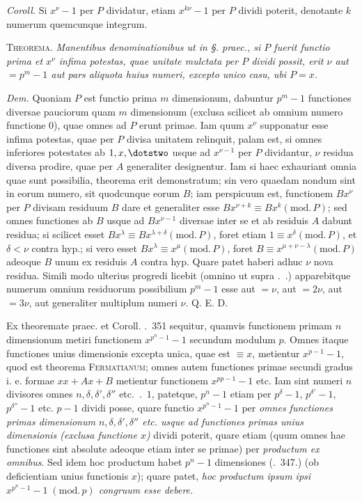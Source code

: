 \emph{Coroll.} Si $x^\nu-1$ per $P$ dividatur, etiam $x^{k\nu}-1$ per $P$ dividi poterit, denotante $k$ numerum quemcunque integrum.

\textsc{Theorema.} \emph{Manentibus denominationibus ut in §. praec., si $P$ fuerit functio prima et $x^\nu$ infima potestas, quae unitate mulctata per $P$ dividi possit, erit $\nu$ aut $=p^m-1$ aut pars aliquota huius numeri, excepto unico casu, ubi $P=x$.}

\emph{Dem.} Quoniam $P$ est functio prima $m$ dimensionum, dabuntur $p^m-1$ functiones diversae pauciorum quam $m$ dimensionum (exclusa scilicet ab omnium numero functione $0$), quae omnes ad $P$ erunt primae. Iam quum $x^\nu$ supponatur esse infima potestas, quae per $P$ divisa unitatem relinquit, palam est, si omnes inferiores potestates ab $1,x,\dotstwo$ usque ad $x^{\nu-1}$ per $P$ dividantur, $\nu$ residua diversa prodire, quae per $A$ generaliter designentur. Iam si haec exhauriant omnia quae sunt possibilia, theorema erit demonstratum; sin vero quaedam nondum sint in eorum numero, sit quodcunque eorum $B$; iam perspicuum est, functionem $Bx^\nu$ per $P$ divisam residuum $B$ dare et generaliter esse $Bx^{\nu+k}\equiv Bx^k(\mathrm{mod.}\,P)$; sed omnes functiones ab $B$ usque ad $Bx^{\nu-1}$ diversae inter se et ab residuis $A$
dabunt residua; si scilicet esset $Bx^\lambda\equiv Bx^{\lambda+\delta}(\mathrm{mod.}\,P)$, foret etiam $1\equiv x^\delta(\mathrm{mod.}\,P)$, et $\delta<\nu$ contra hyp.; si vero esset $Bx^\lambda\equiv x^\mu(\mathrm{mod.}\,P)$, foret $B\equiv x^{\mu+\nu-\lambda}(\mathrm{mod.}\,P)$ adeoque $B$ unum ex residuis $A$ contra hyp. Quare patet haberi adhuc $\nu$ nova residua. Simili modo ulterius progredi licebit (omnino ut supra \textsection.\ .) apparebitque numerum omnium residuorum possibilium $p^m-1$ esse aut $=\nu$, aut $=2\nu$, aut $=3\nu$, aut generaliter multiplum numeri $\nu$. Q. E. D.

Ex theoremate praec. et Coroll. \textsection.\ 351 sequitur, quamvis functionem primam $n$ dimensionum metiri functionem $x^{p^n-1}-1$ secundum modulum $p$. Omnes itaque functiones unius dimensionis excepta unica, quae est $\equiv x$, metientur $x^{p-1}-1$, quod est theorema \textsc{Fermatianum}; omnes autem functiones primae secundi gradus i. e. formae $xx+Ax+B$ metientur functionem $x^{pp-1}-1$ etc. Iam sint numeri $n$ divisores omnes $n,\delta,\delta',\delta''$ etc.\ .\ $1$, patetque, $p^n-1$ etiam per $p^\delta-1$, $p^{\delta'}-1$, $p^{\delta''}-1$ etc. $p-1$ dividi posse, quare functio $x^{p^n-1}-1$ per \emph{omnes functiones primas dimensionum $n,\delta,\delta',\delta''$ etc. usque ad functiones primas unius dimensionis (exclusa functione $x$)} dividi poterit, quare etiam (quum omnes hae functiones sint absolute adeoque etiam inter se primae) per \emph{productum ex omnibus}. Sed idem hoc productum habet $p^n-1$ dimensiones (\textsection.\ 347.) (ob deficientiam unius functionis $x$); quare patet, \emph{hoc productum ipsum ipsi $x^{p^n-1}-1\;(\mathrm{mod.}\,p)$ congruum esse debere.}

